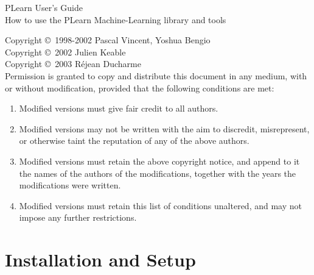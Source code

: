 \documentclass[11pt]{book}
\begin{document}
\thispagestyle{empty}

\thispagestyle{empty}
\begin{center}
{\Huge PLearn User's Guide}\\
\vspace{.5cm}
{\Large How to use the PLearn Machine-Learning library and tools}\\ 
\end{center}
\pagebreak


\vspace*{10cm}

{\small

Copyright \copyright\ 1998-2002 Pascal Vincent, Yoshua Bengio \\
Copyright \copyright\ 2002 Julien Keable \\
Copyright \copyright\ 2003 R\'ejean Ducharme \\

Permission is granted to copy and distribute this document in any medium,
with or without modification, provided that the following conditions are
met:

\begin{enumerate}
\item Modified versions must give fair credit to all authors.
\item Modified versions may not be written with the aim to discredit, misrepresent, or otherwise taint the
      reputation of any of the above authors.
\item Modified versions must retain the above copyright notice, and append to
   it the names of the authors of the modifications, together with the years the
   modifications were written.
\item Modified versions must retain this list of conditions unaltered, 
    and may not impose any further restrictions.
\end{enumerate}
}

\pagebreak

\tableofcontents

\cleardoublepage\pagebreak
{}


\chapter{Installation and Setup}
\label{chap:label}
\end{document}
